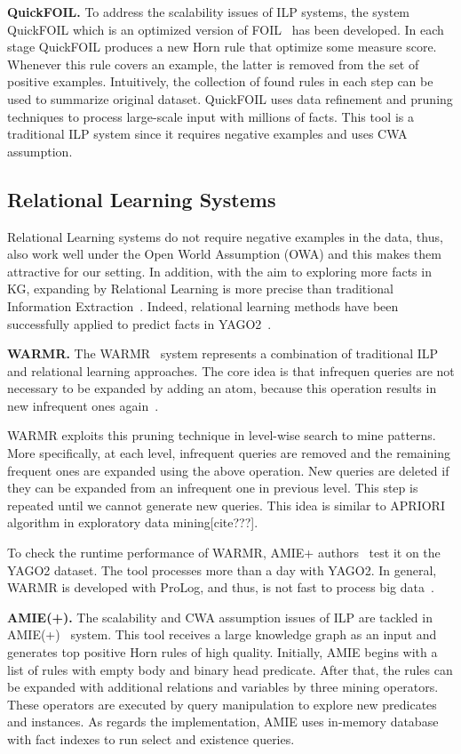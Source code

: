 \textbf{QuickFOIL.} To address the scalability issues of ILP systems, the system QuickFOIL which is an optimized version of FOIL~\cite{ref36} has been developed. In each stage QuickFOIL produces a new Horn rule that optimize some measure score. Whenever this rule covers an example, the latter is removed from the set of positive examples. Intuitively, the collection of found rules in each step can be used to summarize original dataset. QuickFOIL uses data refinement and pruning techniques to process large-scale input with millions of facts. This tool is a traditional ILP system since it requires negative examples and uses CWA assumption.

\subsection{Relational Learning Systems}

Relational Learning systems do not require negative examples in the data, thus, also work well under the Open World Assumption (OWA) and this makes them attractive for our setting. In addition, with the aim to exploring more facts in KG, expanding by Relational Learning is more precise than traditional Information Extraction~\cite{ref29}. Indeed, relational learning methods have been successfully applied to predict facts in YAGO2~\cite{ref30}.

\textbf{WARMR.} The WARMR~\cite{ref16, ref17} system represents a combination of traditional ILP and relational learning approaches. The core idea is that infrequen queries are not necessary to be expanded by adding an atom, because this operation results in new infrequent ones again~\cite{ref17}. 

WARMR exploits this pruning technique in level-wise search to mine patterns. More specifically, at each level, infrequent queries are removed and the remaining frequent ones are expanded using the above operation. New queries are deleted if they can be expanded from an infrequent one in previous level. This step is repeated until we cannot generate new queries. This idea is similar to APRIORI algorithm in exploratory data mining[cite???].

To check the runtime performance of WARMR, AMIE+ authors~\cite{ref10} test it on the YAGO2 dataset. The tool processes more than a day with YAGO2. In general, WARMR is developed with ProLog, and thus, is not fast to process big data~\cite{ref10}.

\textbf{AMIE(+).} The scalability and CWA assumption issues of ILP are tackled in AMIE(+)~\cite{ref10} system. This tool receives a large knowledge graph as an input and generates top positive Horn rules of high quality. Initially, AMIE begins with a list of rules with empty body and binary head predicate. After that, the rules can be expanded with additional relations and variables by three mining operators. These operators are executed by query manipulation to explore new predicates and instances. As regards the implementation, AMIE uses in-memory database with fact indexes to run select and existence queries.

